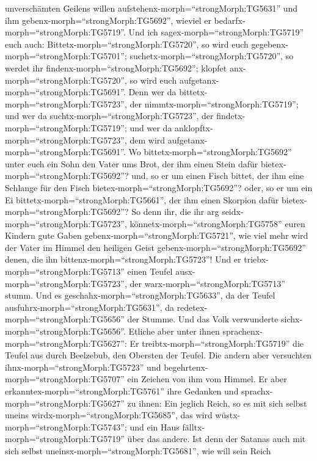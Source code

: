 unverschämten Geilens willen aufstehenx-morph=``strongMorph:TG5631'' und
ihm gebenx-morph=``strongMorph:TG5692'', wieviel er
bedarfx-morph=``strongMorph:TG5719''.  Und ich
sagex-morph=``strongMorph:TG5719'' euch auch:
Bittetx-morph=``strongMorph:TG5720'', so wird euch
gegebenx-morph=``strongMorph:TG5701'';
suchetx-morph=``strongMorph:TG5720'', so werdet ihr
findenx-morph=``strongMorph:TG5692''; klopfet
anx-morph=``strongMorph:TG5720'', so wird euch
aufgetanx-morph=``strongMorph:TG5691''.  Denn wer da
bittetx-morph=``strongMorph:TG5723'', der
nimmtx-morph=``strongMorph:TG5719''; und wer da
suchtx-morph=``strongMorph:TG5723'', der
findetx-morph=``strongMorph:TG5719''; und wer da
anklopftx-morph=``strongMorph:TG5723'', dem wird
aufgetanx-morph=``strongMorph:TG5691''.  Wo
bittetx-morph=``strongMorph:TG5692'' unter euch ein Sohn den Vater ums
Brot, der ihm einen Stein dafür bietex-morph=``strongMorph:TG5692''?
und, so er um einen Fisch bittet, der ihm eine Schlange für den Fisch
bietex-morph=``strongMorph:TG5692''?  oder, so er um ein Ei
bittetx-morph=``strongMorph:TG5661'', der ihm einen Skorpion dafür
bietex-morph=``strongMorph:TG5692''?  So denn ihr, die ihr
arg seidx-morph=``strongMorph:TG5723'',
könnetx-morph=``strongMorph:TG5758'' euren Kindern gute Gaben
gebenx-morph=``strongMorph:TG5721'', wie viel mehr wird der Vater im
Himmel den heiligen Geist gebenx-morph=``strongMorph:TG5692'' denen, die
ihn bittenx-morph=``strongMorph:TG5723''!  Und er
triebx-morph=``strongMorph:TG5713'' einen Teufel
ausx-morph=``strongMorph:TG5723'', der warx-morph=``strongMorph:TG5713''
stumm. Und es geschahx-morph=``strongMorph:TG5633'', da der Teufel
ausfuhrx-morph=``strongMorph:TG5631'', da
redetex-morph=``strongMorph:TG5656'' der Stumme. Und das Volk
verwunderte sichx-morph=``strongMorph:TG5656''.  Etliche
aber unter ihnen sprachenx-morph=``strongMorph:TG5627'': Er
treibtx-morph=``strongMorph:TG5719'' die Teufel aus durch Beelzebub, den
Obersten der Teufel.  Die andern aber versuchten
ihnx-morph=``strongMorph:TG5723'' und
begehrtenx-morph=``strongMorph:TG5707'' ein Zeichen von ihm vom Himmel.
 Er aber erkanntex-morph=``strongMorph:TG5761'' ihre
Gedanken und sprachx-morph=``strongMorph:TG5627'' zu ihnen: Ein jeglich
Reich, so es mit sich selbst uneins wirdx-morph=``strongMorph:TG5685'',
das wird wüstx-morph=``strongMorph:TG5743''; und ein Haus
fälltx-morph=``strongMorph:TG5719'' über das andere.  Ist
denn der Satanas auch mit sich selbst
uneinsx-morph=``strongMorph:TG5681'', wie will sein Reich
